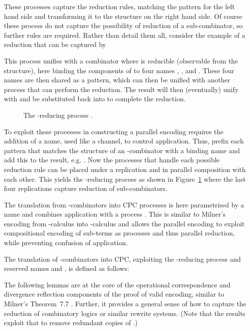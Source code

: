 \documentclass{llncs}
\begin{document}
\normalsize
These processes capture the reduction rules, matching the pattern for the left hand side and transforming it to the structure on the right hand side.
Of course these process do not capture the possibility of reduction of a sub-combinator, so further rules are required.
Rather than detail them all, consider the example of a reduction  that can be captured by

This process unifies with a combinator  where  is reducible (observable from the structure), here binding the components of  to four names , ,  and . These four names are then shared as a pattern, which can then be unified with another process that can perform the reduction. The result will then (eventually) unify with  and be substituted back into  to complete the reduction.

\begin{figure}[t]

\caption{The -reducing process .}
\label{fig:SF-red-paper}
\end{figure}

To exploit these processes in constructing a parallel encoding requires the addition of a name,
used like a channel, to control application. Thus, prefix each pattern that matches the structure
of an -combinator with a binding name  and add this to the result, e.g.
.
Now the processes that handle each possible reduction rule can be placed under a replication
and in parallel composition with each other. This yields the -reducing process 
as shown in Figure~\ref{fig:SF-red-paper} where the last four replications capture reduction of
sub-combinators.

The translation  from -combinators into CPC processes is here parametrised by a name  and combines application with a process .
This is similar to Milner's encoding from -calculus into -calculus
and
 allows the parallel encoding to exploit compositional encoding of sub-terms as processes and thus parallel reduction, while preventing confusion of application.


The translation  of -combinators into CPC, exploiting the -reducing process  and reserved names  and , is defined as follows:



The following lemmas are at the core of the operational correspondence and divergence
reflection components of the proof of valid encoding, similar to Milner's Theorem~7.7 \cite{90426}.
Further, it provides a general sense of how to capture the reduction of combinatory logics or
similar rewrite systems.
(Note that the results exploit that  to
remove redundant copies of  \cite[Theorem~8.7.2]{GivenWilsonPHD}.)
\end{document}
